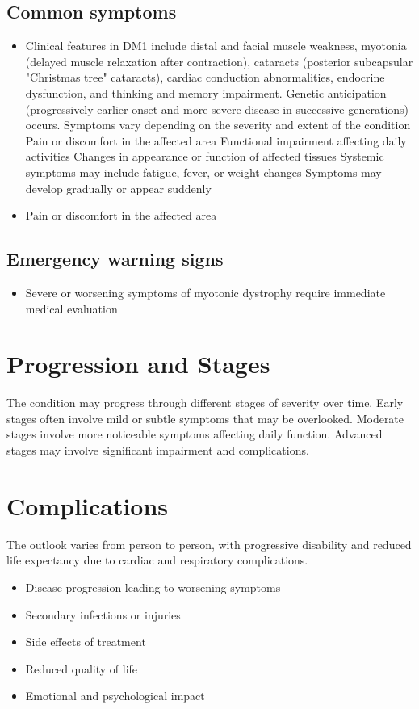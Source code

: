 \subsection{Common symptoms}
\begin{itemize}[noitemsep]
  \item Clinical features in DM1 include distal and facial muscle weakness, myotonia (delayed muscle relaxation after contraction), cataracts (posterior subcapsular "Christmas tree" cataracts), cardiac conduction abnormalities, endocrine dysfunction, and thinking and memory impairment. Genetic anticipation (progressively earlier onset and more severe disease in successive generations) occurs. Symptoms vary depending on the severity and extent of the condition Pain or discomfort in the affected area Functional impairment affecting daily activities Changes in appearance or function of affected tissues Systemic symptoms may include fatigue, fever, or weight changes Symptoms may develop gradually or appear suddenly
  \item Pain or discomfort in the affected area
  \end{itemize}

\subsection{Emergency warning signs}
\begin{itemize}[noitemsep]
  \item Severe or worsening symptoms of myotonic dystrophy require immediate medical evaluation
\end{itemize}
\section{Progression and Stages}
The condition may progress through different stages of severity over time. Early stages often involve mild or subtle symptoms that may be overlooked. Moderate stages involve more noticeable symptoms affecting daily function. Advanced stages may involve significant impairment and complications.
\section{Complications}
The outlook varies from person to person, with progressive disability and reduced life expectancy due to cardiac and respiratory complications.

\begin{itemize}[noitemsep]
  \item Disease progression leading to worsening symptoms
  \item Secondary infections or injuries
  \item Side effects of treatment
  \item Reduced quality of life
  \item Emotional and psychological impact
\end{itemize}
